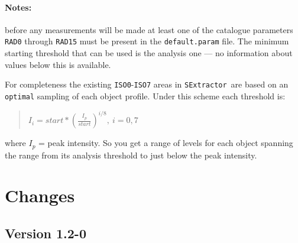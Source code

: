 \documentclass[twoside,11pt]{article}
\renewcommand{\_}{\texttt{\symbol{95}}}
\newcommand{\SExtractor}{\texttt{SExtractor}}
\begin{document}
\paragraph{Notes:} before any measurements will be made at least one
of the catalogue parameters \texttt{RAD0} through \texttt{RAD15} must
be present in the \texttt{default.param} file. The minimum starting
threshold that can be used is the analysis one ---  no information about
values below this is available.

For completeness the existing \texttt{ISO0}-\texttt{ISO7} areas in
\SExtractor\ are based on an \texttt{optimal} sampling of each object
profile. Under this scheme each threshold is:
\begin{quote}
    $I_{i} = start * (\frac{I_{p}}{start})^{i/8}, \ i = 0, 7$
\end{quote}
where $I_{p}$ = peak intensity.  So you get a range of levels for each
object spanning the range from its analysis threshold to just below
the peak intensity.

\section{Changes}
\subsection{Version 1.2-0}
\end{document}
